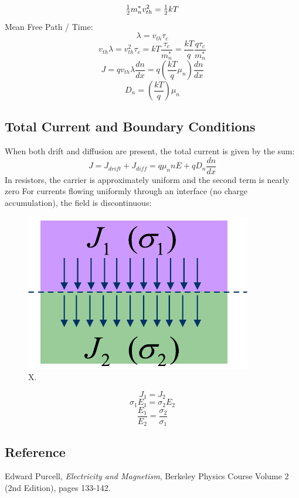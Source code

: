 \begin{equation}
	{\textstyle{1 \over 2}}m_n^*v_{th}^2 = {\textstyle{1 \over 2}}kT
\end{equation}
Mean Free Path / Time:
\begin{equation}
	\lambda  = {v_{th}}{\tau _c}
\end{equation} 
\begin{equation} 
	{v_{th}}\lambda  = v_{th}^2{\tau _c} = kT\frac{{{\tau _c}}}{{m_n^*}} = \frac{{kT}}{q}\frac{{q{\tau _c}}}{{m_n^*}}
\end{equation}
\begin{equation}
	J = q{v_{th}}\lambda \frac{{dn}}{{dx}} = q\left( {\frac{{kT}}{q}{\mu _n}} \right)\frac{{dn}}{{dx}}
\end{equation}
\begin{equation}
	{D_n} = \left( {\frac{{kT}}{q}} \right){\mu _n}
\end{equation}





\subsection{Total Current and Boundary Conditions}
  
 When both drift and diffusion are present, the total current is given by the sum:
\begin{equation}
	J = {J_{drift}} + {J_{diff}} = q{\mu _n}nE + q{D_n}\frac{{dn}}{{dx}}
\end{equation}
 In resistors, the carrier is approximately uniform and the second term is nearly zero
 For currents flowing uniformly through an interface (no charge accumulation), the field is discontinuous:
 



\begin{figure}
\begin{center}
\includegraphics[width=.5\columnwidth]{slide50}
\end{center}
\caption{X. } \label{fig:slide50}
\end{figure}
\begin{equation} {J_1} = {J_2}\end{equation}
\begin{equation}{\sigma _1}{E_1} = {\sigma _2}{E_2}\end{equation}
\begin{equation}\frac{{{E_1}}}{{{E_2}}} = \frac{{{\sigma _2}}}{{{\sigma _1}}}\end{equation}





\subsection{Reference}


  
 Edward Purcell, \textit{Electricity and Magnetism}, Berkeley Physics Course Volume 2 (2nd Edition), pages 133-142.
 



